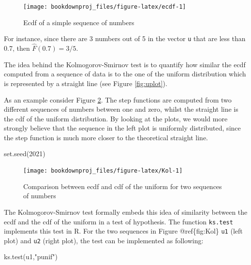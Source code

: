 \documentclass[
]{book}
\newenvironment{Shaded}{\begin{snugshade}}{\end{snugshade}}
\newcommand{\DecValTok}[1]{\textcolor[rgb]{0.00,0.00,0.81}{#1}}
\newcommand{\FunctionTok}[1]{\textcolor[rgb]{0.00,0.00,0.00}{#1}}
\newcommand{\NormalTok}[1]{#1}
\newcommand{\StringTok}[1]{\textcolor[rgb]{0.31,0.60,0.02}{#1}}
\theoremstyle{definition}
\theoremstyle{definition}
\theoremstyle{definition}
\theoremstyle{definition}
\theoremstyle{remark}
\begin{document}
\begin{figure}

{\centering \texttt{[image: bookdownproj\_files/figure-latex/ecdf-1]} 

}

\caption{Ecdf of a simple sequence of numbers}\label{fig:ecdf}
\end{figure}

For instance, since there are 3 numbers out of 5 in the vector \texttt{u} that are less than 0.7, then \(\hat{F}(0.7)=3/5\).

The idea behind the Kolmogorov-Smirnov test is to quantify how similar the ecdf computed from a sequence of data is to the one of the uniform distribution which is represented by a straight line (see Figure \ref{fig:uplot}).

As an example consider Figure \ref{fig:Kol}. The step functions are computed from two different sequences of numbers between one and zero, whilst the straight line is the cdf of the uniform distribution. By looking at the plots, we would more strongly believe that the sequence in the left plot is uniformly distributed, since the step function is much more closer to the theoretical straight line.

\begin{Shaded}
\begin{Highlighting}[]
\FunctionTok{set.seed}\NormalTok{(}\DecValTok{2021}\NormalTok{)}
\end{Highlighting}
\end{Shaded}

\begin{figure}

{\centering \texttt{[image: bookdownproj\_files/figure-latex/Kol-1]} 

}

\caption{Comparison between ecdf and cdf of the uniform for two sequences of numbers}\label{fig:Kol}
\end{figure}

The Kolmogorov-Smirnov test formally embeds this idea of similarity between the ecdf and the cdf of the uniform in a test of hypothesis. The function \texttt{ks.test} implements this test in R. For the two sequences in Figure @ref\{fig:Kol\} \texttt{u1} (left plot) and \texttt{u2} (right plot), the test can be implemented as following:

\begin{Shaded}
\begin{Highlighting}[]
\FunctionTok{ks.test}\NormalTok{(u1,}\StringTok{"punif"}\NormalTok{)}
\end{Highlighting}
\end{Shaded}
\end{document}

